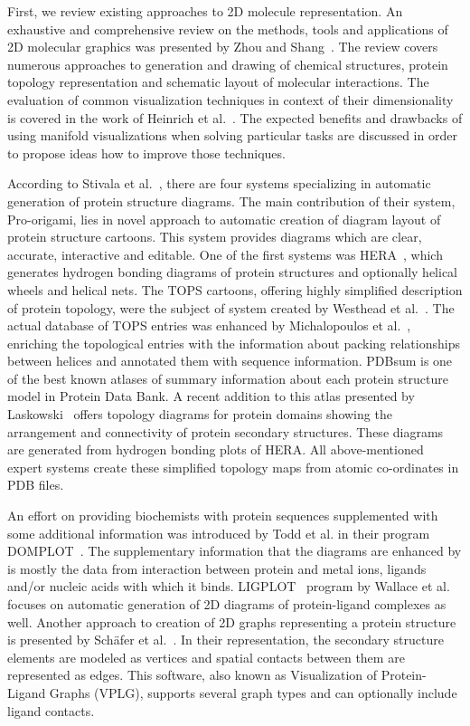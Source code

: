 \documentclass[twocolumn]{bmcart}%
\begin{document}
First, we review existing approaches to 2D molecule representation.
An exhaustive and comprehensive review on the methods, tools and applications of 2D molecular graphics was presented by Zhou and Shang~\cite{Zhou2009}. 
The review covers numerous approaches to generation and drawing of chemical structures, protein topology representation and schematic layout of molecular interactions.
The evaluation of common visualization techniques in context of their dimensionality is covered in the work of Heinrich et al.~\cite{Heinrich2014}.
The expected benefits and drawbacks of using manifold visualizations when solving particular tasks are discussed in order to propose ideas how to improve those techniques.

According to Stivala et al.~\cite{Stivala2011}, there are four systems specializing in automatic generation of protein structure diagrams.
The main contribution of their system, Pro-origami, lies in novel approach to automatic creation of diagram layout of protein structure cartoons.
This system provides diagrams which are clear, accurate, interactive and editable.
One of the first systems was HERA~\cite{Hutchinson1990}, which generates hydrogen bonding diagrams of protein structures and optionally helical wheels and helical nets.
The TOPS cartoons, offering highly simplified description of protein topology, were the subject of system created by Westhead et al.~\cite{Westhead1999}.
The actual database of TOPS entries was enhanced by Michalopoulos et al.~\cite{Michalopoulos2004}, enriching the topological entries with the information about packing relationships between helices and annotated them with sequence information.
PDBsum is one of the best known atlases of summary information about each protein structure model in Protein Data Bank.
A recent addition to this atlas presented by Laskowski~\cite{Laskowski2009} offers topology diagrams for protein domains showing the arrangement and connectivity of protein secondary structures.
These diagrams are generated from hydrogen bonding plots of HERA.
All above-mentioned expert systems create these simplified topology maps from atomic co-ordinates in PDB files.

An effort on providing biochemists with protein sequences supplemented with some additional information was introduced by Todd et al. in their program DOMPLOT~\cite{Todd1999}.
The supplementary information that the diagrams are enhanced by is mostly the data from interaction between protein and metal ions, ligands and/or nucleic acids with which it binds.
LIGPLOT~\cite{Wallace1995} program by Wallace et al. focuses on automatic generation of 2D diagrams of protein-ligand complexes as well.
Another approach to creation of 2D graphs representing a protein structure is presented by Sch{\"a}fer et al.~\cite{Schafer2012}.
In their representation, the secondary structure elements are modeled as vertices and spatial contacts between them are represented as edges.
This software, also known as Visualization of Protein-Ligand Graphs (VPLG), supports several graph types and can optionally include ligand contacts.
\end{document}
